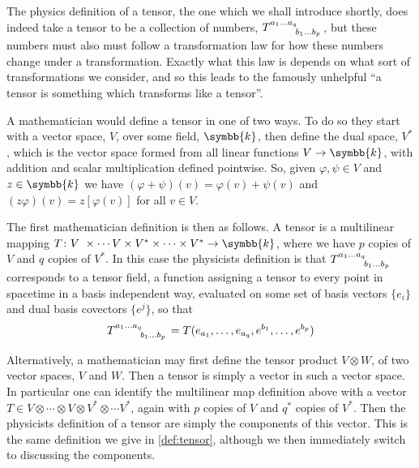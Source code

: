 \documentclass[fleqn]{NotesClass}
\renewcommand{\field}{\symbb{k}}
\renewcommand{\ve}[1]{e_{#1}}
\newcommand{\dualve}[1]{e^{#1}}
\begin{document}
\begin{appendices}
        The physics definition of a tensor, the one which we shall introduce shortly, does indeed take a tensor to be a collection of numbers, \(\tensor{T}{^{a_1\dotso a_q}_{b_1\dotso b_p}}\), but these numbers must also must follow a transformation law for how these numbers change under a transformation.
        Exactly what this law is depends on what sort of transformations we consider, and so this leads to the famously unhelpful \enquote{a tensor is something which transforms like a tensor}.
        
        A mathematician would define a tensor in one of two ways.
        To do so they start with a vector space, \(V\), over some field, \(\field\), then define the dual space, \(V^*\), which is the vector space formed from all linear functions \(V \to \field\), with addition and scalar multiplication defined pointwise.
        So, given \(\varphi, \psi \in V\) and \(z \in \field\) we have \((\varphi + \psi)(v) = \varphi(v) + \psi(v)\) and \((z\varphi)(v) = z[\varphi(v)]\) for all \(v \in V\).
        
        The first mathematician definition is then as follows.
        A tensor is a multilinear mapping \(T \colon V\ \times \dotsm V \times V^* \times \dotsb \times V^* \to \field\), where we have \(p\) copies of \(V\) and \(q\) copies of \(V^*\).
        In this case the physicists definition is that \(\tensor{T}{^{a_1 \dotso a_q}_{b_1 \dotso b_p}}\) corresponds to a tensor field, a function assigning a tensor to every point in spacetime in a basis independent way, evaluated on some set of basis vectors \(\{\ve{i}\}\) and dual basis covectors \(\{\dualve{j}\}\), so that
        \begin{equation}
            \tensor{T}{^{a_1 \dotso a_q}_{b_1 \dotso b_p}} = T(\ve{a_1}, \dotsc, \ve{a_q}, \dualve{b_1}, \dotsc, \dualve{b_p})
        \end{equation}
        
        Alternatively, a mathematician may first define the tensor product \(V \otimes W\), of two vector spaces, \(V\) and \(W\).
        Then a tensor is simply a vector in such a vector space.
        In particular one can identify the multilinear map definition above with a vector \(T \in V \otimes \dotsb \otimes V \otimes V^* \otimes \dotsm V^*\), again with \(p\) copies of \(V\) and \(q^*\) copies of \(V^*\).
        Then the physicists definition of a tensor are simply the components of this vector.
        This is the same definition we give in \cref{def:tensor}, although we then immediately switch to discussing the components.
        

\end{appendices}
\end{document}

